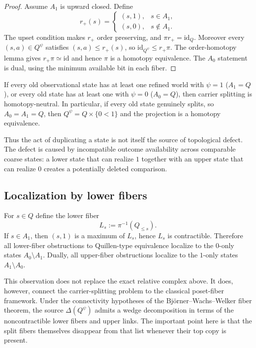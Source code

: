 \begin{proof}
Assume $A_1$ is upward closed.  Define
\[
 r_+(s)=
 \begin{cases}
 (s,1),&s\in A_1,\\
 (s,0),&s\notin A_1.
 \end{cases}
\]
The upset condition makes $r_+$ order preserving, and $\pi r_+=\mathrm{id}_Q$.
Moreover every $(s,a)\in Q^\psi$ satisfies $(s,a)\leq r_+(s)$, so
$\mathrm{id}_{Q^\psi}\leq r_+\pi$.  The order-homotopy lemma gives
$r_+\pi\simeq\mathrm{id}$ and hence $\pi$ is a homotopy equivalence.  The
$A_0$ statement is dual, using the minimum available bit in each fiber.
\end{proof}

\begin{corollary}
If every old observational state has at least one refined world with $\psi=1$
($A_1=Q$), or every old state has at least one with $\psi=0$ ($A_0=Q$), then
carrier splitting is homotopy-neutral.  In particular, if every old state genuinely
splits, so $A_0=A_1=Q$, then $Q^\psi=Q\times\{0<1\}$ and the projection is a
homotopy equivalence.
\end{corollary}

Thus the act of duplicating a state is not itself the source of topological defect.
The defect is caused by incompatible outcome availability across comparable coarse
states: a lower state that can realize $1$ together with an upper state that can
realize $0$ creates a potentially deleted comparison.

\subsection{Localization by lower fibers}

For $s\in Q$ define the lower fiber
\[
 L_s:=\pi^{-1}(Q_{\leq s}).
\]
If $s\in A_1$, then $(s,1)$ is a maximum of $L_s$, hence $L_s$ is
contractible.  Therefore all lower-fiber obstructions to Quillen-type equivalence
localize to the $0$-only states $A_0\setminus A_1$.  Dually, all upper-fiber
obstructions localize to the $1$-only states $A_1\setminus A_0$.

This observation does not replace the exact relative complex above.  It does,
however, connect the carrier-splitting problem to the classical poset-fiber
framework.  Under the connectivity hypotheses of the Bj\"orner--Wachs--Welker
fiber theorem, the source $\Delta(Q^\psi)$ admits a wedge decomposition in terms
of the noncontractible lower fibers and upper links.  The important point here is
that the split fibers themselves disappear from that list whenever their top copy
is present.

